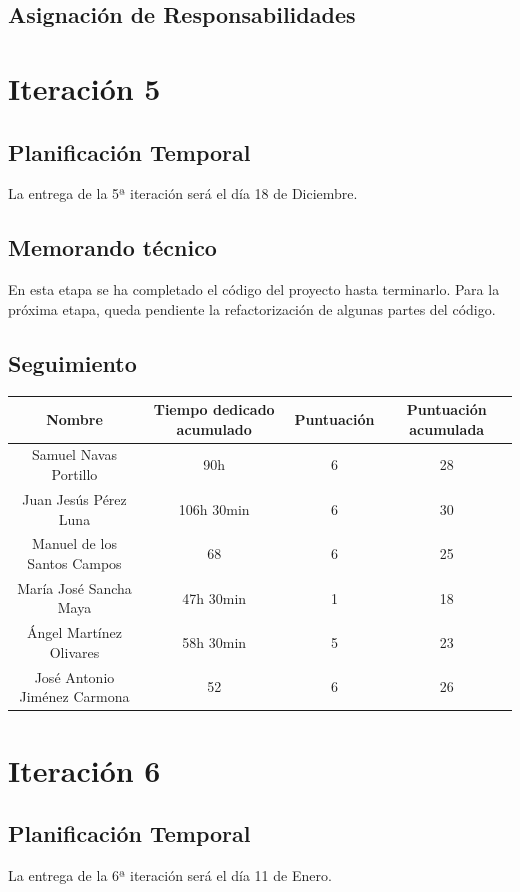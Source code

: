 \documentclass[11 pt]{book}
\begin{document}
	\section{Asignación de Responsabilidades}
		

\chapter{Iteración 5}
	\section{Planificación Temporal}
		La entrega de la 5ª iteración será el día 18 de Diciembre.

	\section{Memorando técnico}
		En esta etapa se ha completado el código del proyecto hasta terminarlo. Para la próxima etapa, queda pendiente la refactorización de algunas partes del código.
	
	\section{Seguimiento}
		\begin{tabular}{|c|c|c|c|}
			\hline
			Nombre & Tiempo dedicado acumulado & Puntuación & Puntuación acumulada\\
			\hline
			Samuel Navas Portillo & 90h & 6 & 28\\
			Juan Jesús Pérez Luna & 106h 30min & 6 & 30\\
			Manuel de los Santos Campos & 68 & 6 & 25\\
			María José Sancha Maya & 47h 30min & 1 & 18\\
			Ángel Martínez Olivares & 58h 30min & 5 & 23\\
			José Antonio Jiménez Carmona & 52 & 6 & 26\\
			\hline
		\end{tabular}
	
\chapter{Iteración 6}
	\section{Planificación Temporal}
		La entrega de la 6ª iteración será el día 11 de Enero.
\end{document}

